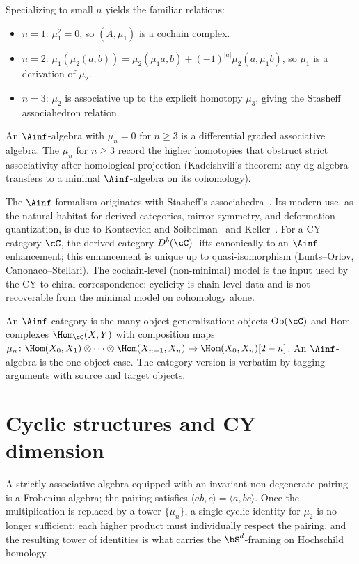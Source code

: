Specializing to small $n$ yields the familiar relations:
\begin{itemize}
 \item $n = 1$: $\mu_1^2 = 0$, so $(A, \mu_1)$ is a cochain complex.
 \item $n = 2$: $\mu_1(\mu_2(a,b)) = \mu_2(\mu_1 a, b) + (-1)^{|a|} \mu_2(a, \mu_1 b)$, so $\mu_1$ is a derivation of $\mu_2$.
 \item $n = 3$: $\mu_2$ is associative up to the explicit homotopy $\mu_3$, giving the Stasheff associahedron relation.
\end{itemize}
An $\Ainf$-algebra with $\mu_n = 0$ for $n \geq 3$ is a differential graded associative algebra. The $\mu_n$ for $n \geq 3$ record the higher homotopies that obstruct strict associativity after homological projection (Kadeishvili's theorem: any dg algebra transfers to a minimal $\Ainf$-algebra on its cohomology).

The $\Ainf$-formalism originates with Stasheff's associahedra~\cite{Stasheff1963}. Its modern use, as the natural habitat for derived categories, mirror symmetry, and deformation quantization, is due to Kontsevich and Soibelman~\cite{KontsevichSoibelman2009} and Keller~\cite{Keller2001Ainfty}. For a CY category $\cC$, the derived category $D^b(\cC)$ lifts canonically to an $\Ainf$-enhancement; this enhancement is unique up to quasi-isomorphism (Lunts--Orlov, Canonaco--Stellari). The cochain-level (non-minimal) model is the input used by the CY-to-chiral correspondence: cyclicity is chain-level data and is not recoverable from the minimal model on cohomology alone.

\begin{remark}
\label{rem:ainf-cat-vs-algebra}
An $\Ainf$-category is the many-object generalization: objects $\mathrm{Ob}(\cC)$ and Hom-complexes $\Hom_\cC(X,Y)$ with composition maps $\mu_n \colon \Hom(X_0,X_1) \otimes \cdots \otimes \Hom(X_{n-1},X_n) \to \Hom(X_0,X_n)[2-n]$. An $\Ainf$-algebra is the one-object case. The category version is verbatim by tagging arguments with source and target objects.
\end{remark}

\section{Cyclic structures and CY dimension}
\label{sec:cyclic-structures}

A strictly associative algebra equipped with an invariant non-degenerate pairing is a Frobenius algebra; the pairing satisfies $\langle ab, c \rangle = \langle a, bc \rangle$. Once the multiplication is replaced by a tower $\{\mu_n\}$, a single cyclic identity for $\mu_2$ is no longer sufficient: each higher product must individually respect the pairing, and the resulting tower of identities is what carries the $\bS^d$-framing on Hochschild homology.

